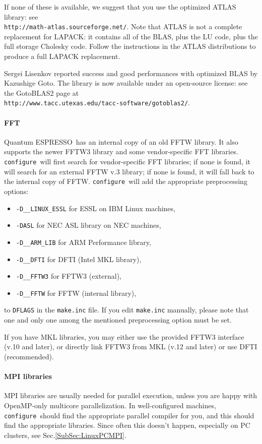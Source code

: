 \documentclass[12pt,a4paper]{article}
\def\qe{{\sc Quantum ESPRESSO}}
\def\configure{\texttt{configure}}
\begin{document}
If none of these is available, we suggest that you use the optimized ATLAS
library: see \\
\texttt{http://math-atlas.sourceforge.net/}. Note that ATLAS is not
a complete replacement for LAPACK: it contains all of the BLAS, plus the
LU code, plus the full storage Cholesky code. Follow the instructions in the
ATLAS distributions to produce a full LAPACK replacement.

Sergei Lisenkov reported success and good performances with optimized
BLAS by Kazushige Goto. The library is now available under an
open-source license: see the GotoBLAS2 page at \\
\texttt{http://www.tacc.utexas.edu/tacc-software/gotoblas2/}.

\paragraph{FFT}
\qe\ has an internal copy of an old FFTW library. It also supports
the newer FFTW3 library and some vendor-specific FFT libraries.
\configure\ will first search for vendor-specific FFT libraries;
if none is found, it will search for an external FFTW v.3 library;
if none is found, it will fall back to the internal  copy of FFTW.
\configure\ will add the appropriate preprocessing options:
\begin{itemize}
\item \texttt{-D\_\_LINUX\_ESSL} for ESSL on IBM Linux machines,
\item \texttt{-DASL} for NEC ASL library on NEC machines,
\item \texttt{-D\_\_ARM\_LIB} for ARM Performance library,
\item \texttt{-D\_\_DFTI}  for DFTI (Intel MKL library),
\item \texttt{-D\_\_FFTW3} for FFTW3 (external),
\item \texttt{-D\_\_FFTW}  for FFTW (internal library),
\end{itemize}
to \texttt{DFLAGS} in the \texttt{make.inc} file.
If you edit \texttt{make.inc} manually, please note that one and
only one among the mentioned preprocessing option must be set.

If you have MKL libraries, you may either use the provided FFTW3
interface (v.10 and later), or directly link FFTW3 from MKL (v.12
and later) or use DFTI (recommended).

\paragraph{MPI libraries}
MPI libraries are usually needed for parallel execution, unless you are 
happy with OpenMP-only multicore parallelization.
In well-configured machines, \configure\ should find the appropriate
parallel compiler for you, and this should find the appropriate
libraries. Since often this doesn't
happen, especially on PC clusters, see Sec.\ref{SubSec:LinuxPCMPI}.
\end{document}

